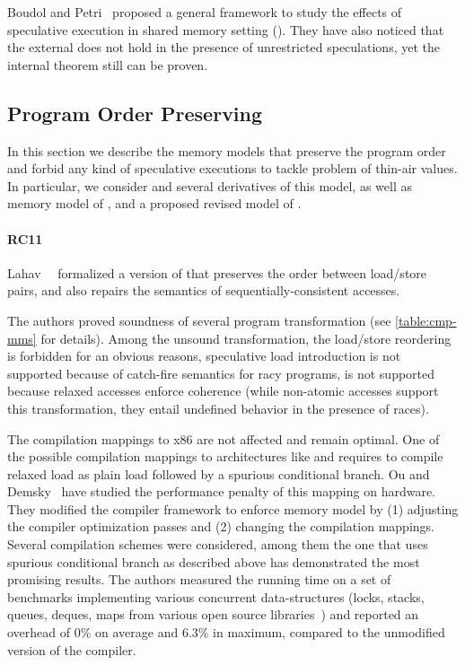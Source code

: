 Boudol and Petri~\cite{Boudol-Petri:ESOP10} proposed a general 
framework to study the effects of speculative execution in
shared memory setting (\TSC). 
They have also noticed that the external \DRF does not 
hold in the presence of unrestricted speculations, 
yet the internal \DRF theorem still can be proven. 

\subsection{Program Order Preserving}
\label{sec:catalog:porf}

In this section we describe the memory models 
that preserve the program order and forbid any 
kind of speculative executions to tackle problem 
of thin-air values. 
In particular, we consider \RCMM and 
several derivatives of this model, 
as well as memory model of \OCaml, 
and a proposed revised model of \Java.  

\paragraph{RC11}

Lahav~\etal~\cite{Lahav-al:PLDI17} formalized 
a version of \CMM that preserves the order between load/store pairs, 
and also repairs the semantics of sequentially-consistent accesses.

The authors proved soundness of several program transformation 
(see \cref{table:cmp-mms} for details). 
Among the unsound transformation, 
the load/store reordering is forbidden for an obvious reasons, 
speculative load introduction is not supported 
because of catch-fire semantics for racy programs, 
\CSE is not supported because relaxed accesses 
enforce coherence (while non-atomic accesses 
support this transformation, they entail 
undefined behavior in the presence of races).

The compilation mappings to x86 are not affected and remain optimal.
One of the possible compilation mappings 
to architectures like \ARM and \POWER 
requires to compile relaxed load as  
plain load followed by a spurious conditional branch.
Ou and Demsky~\cite{Ou-Demsky:OOPSLA18} have studied 
the performance penalty of this mapping on  hardware.
They modified the \LLVM compiler framework 
to enforce \RCMM memory model
by (1) adjusting the compiler optimization passes and 
(2) changing the compilation mappings.
Several compilation schemes were considered,
among them the one that uses spurious conditional branch
as described above has demonstrated the most promising results.  
The authors measured the running time on a set of benchmarks 
implementing various concurrent data-structures
(\eg locks, stacks, queues, deques, maps
from various open source libraries~\cite{CDSLib, FollyLib, JunctionLib})
and reported an overhead of 0\% on average and 6.3\% in maximum,
compared to the unmodified version of the compiler. 

